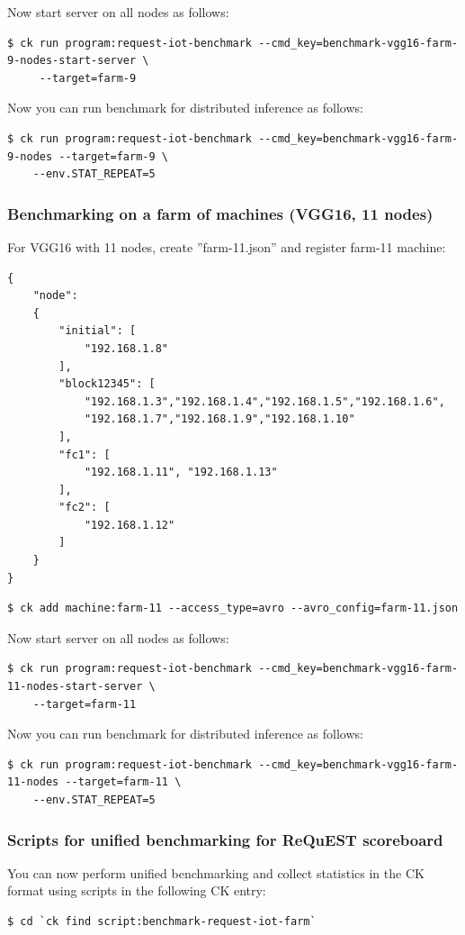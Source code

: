 \documentclass[sigplan]{acmart}
\begin{document}
Now start server on all nodes as follows:
\begin{verbatim}
$ ck run program:request-iot-benchmark --cmd_key=benchmark-vgg16-farm-9-nodes-start-server \
     --target=farm-9 
\end{verbatim}
Now you can run benchmark for distributed inference as follows:
\begin{verbatim}
$ ck run program:request-iot-benchmark --cmd_key=benchmark-vgg16-farm-9-nodes --target=farm-9 \
    --env.STAT_REPEAT=5
\end{verbatim}

\subsubsection{Benchmarking on a farm of machines (VGG16, 11 nodes)}

For VGG16 with 11 nodes, create ''farm-11.json'' and register farm-11 machine:
\begin{verbatim}
{
    "node":
    {
        "initial": [
            "192.168.1.8"
        ],
        "block12345": [
            "192.168.1.3","192.168.1.4","192.168.1.5","192.168.1.6",
            "192.168.1.7","192.168.1.9","192.168.1.10"
        ],
        "fc1": [
            "192.168.1.11", "192.168.1.13"
        ],
        "fc2": [
            "192.168.1.12"
        ]
    }
}
\end{verbatim}

\begin{verbatim}
$ ck add machine:farm-11 --access_type=avro --avro_config=farm-11.json
\end{verbatim}

Now start server on all nodes as follows:
\begin{verbatim}
$ ck run program:request-iot-benchmark --cmd_key=benchmark-vgg16-farm-11-nodes-start-server \
    --target=farm-11 
\end{verbatim}
Now you can run benchmark for distributed inference as follows:
\begin{verbatim}
$ ck run program:request-iot-benchmark --cmd_key=benchmark-vgg16-farm-11-nodes --target=farm-11 \
    --env.STAT_REPEAT=5
\end{verbatim}

\subsubsection{Scripts for unified benchmarking for ReQuEST scoreboard}

You can now perform unified benchmarking and collect statistics in the CK format using scripts in the following CK entry:
\begin{verbatim}
$ cd `ck find script:benchmark-request-iot-farm`
\end{verbatim}
\end{document}
